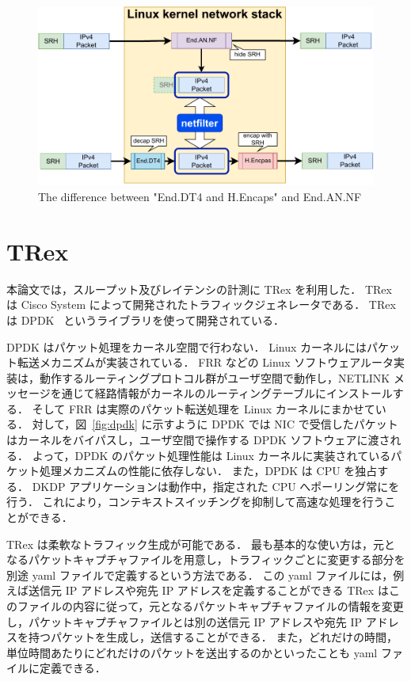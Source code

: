 \begin{figure}[t]
    \centering
    \includegraphics[width=0.95\linewidth]{img/Diff.pdf}
    \caption{The difference between "End.DT4 and H.Encaps" and End.AN.NF}
    \label{fig:diff}
\end{figure}

\section{TRex}
\label{sec:trex}
本論文では，スループット及びレイテンシの計測に TRex を利用した．
TRex は Cisco System によって開発されたトラフィックジェネレータである．
TRex は DPDK~\cite{dpdk} というライブラリを使って開発されている．

DPDK はパケット処理をカーネル空間で行わない．
Linux カーネルにはパケット転送メカニズムが実装されている．
FRR などの Linux ソフトウェアルータ実装は，動作するルーティングプロトコル群がユーザ空間で動作し，NETLINK メッセージを通じて経路情報がカーネルのルーティングテーブルにインストールする．
そして FRR は実際のパケット転送処理を Linux カーネルにまかせている．
対して，図~\ref*{fig:dpdk} に示すように DPDK では NIC で受信したパケットはカーネルをバイパスし，ユーザ空間で操作する DPDK ソフトウェアに渡される．
よって，DPDK のパケット処理性能は Linux カーネルに実装されているパケット処理メカニズムの性能に依存しない．
また，DPDK は CPU を独占する．
DKDP アプリケーションは動作中，指定された CPU へポーリング常にを行う．
これにより，コンテキストスイッチングを抑制して高速な処理を行うことができる．

TRex は柔軟なトラフィック生成が可能である．
最も基本的な使い方は，元となるパケットキャプチャファイルを用意し，トラフィックごとに変更する部分を別途 yaml ファイルで定義するという方法である．
この yaml ファイルには，例えば送信元 IP アドレスや宛先 IP アドレスを定義することができる
TRex はこのファイルの内容に従って，元となるパケットキャプチャファイルの情報を変更し，パケットキャプチャファイルとは別の送信元 IP アドレスや宛先 IP アドレスを持つパケットを生成し，送信することができる．
また，どれだけの時間，単位時間あたりにどれだけのパケットを送出するのかといったことも yaml ファイルに定義できる．

